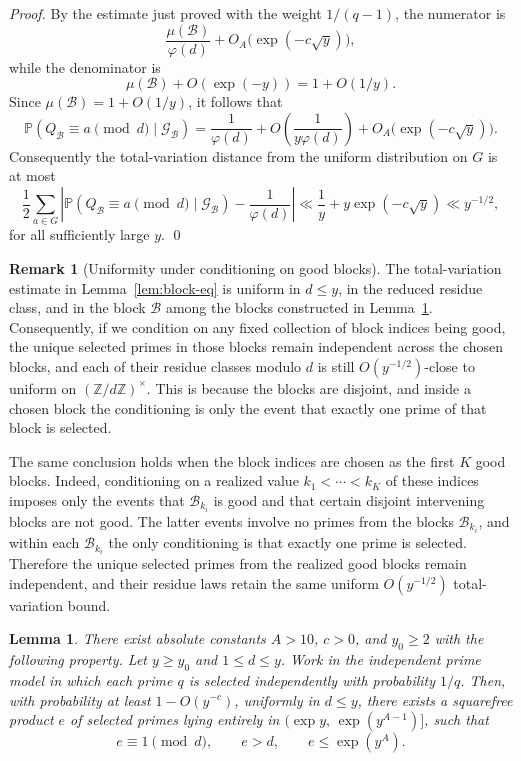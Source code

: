 \documentclass[11pt,reqno]{amsart}
\theoremstyle{plain}
\newtheorem{lemma}[theorem]{Lemma}
\theoremstyle{definition}
\newtheorem{remark}[theorem]{Remark}
\newcommand{\ZZ}{\mathbb{Z}}
\newcommand{\PP}{\mathbb{P}}
\begin{document}
\begin{proof}
By the estimate just proved with the weight $1/(q-1)$, the numerator is
\[
\frac{\mu(\mathcal B)}{\varphi(d)}
+
O_A\bigl(\exp(-c\sqrt y)\bigr),
\]
while the denominator is
\[
\mu(\mathcal B)+O(\exp(-y))=1+O(1/y).
\]
Since $\mu(\mathcal B)=1+O(1/y)$, it follows that
\[
\PP(Q_{\mathcal B}\equiv a\pmod d\mid \mathcal G_{\mathcal B})
=
\frac1{\varphi(d)}
+
O\!\left(\frac{1}{y\varphi(d)}\right)
+
O_A\bigl(\exp(-c\sqrt y)\bigr).
\]
Consequently the total-variation distance from the uniform distribution on
$G$ is at most
\[
\frac12\sum_{a\in G}
\left|
\PP(Q_{\mathcal B}\equiv a\pmod d\mid \mathcal G_{\mathcal B})
-\frac1{\varphi(d)}
\right|
\ll
\frac1y+y\exp(-c\sqrt y)
\ll y^{-1/2},
\]
for all sufficiently large $y$. \qed
\end{proof}

\begin{remark}[Uniformity under conditioning on good blocks]\label{rem:block-uniformity}
The total-variation estimate in Lemma~\ref{lem:block-eq} is uniform in
$d\le y$, in the reduced residue class, and in the block $\mathcal B$ among
the blocks constructed in Lemma~\ref{lem:composite-successor}. Consequently,
if we condition on any fixed collection of block indices being good, the unique
selected primes in those blocks remain independent across the chosen blocks,
and each of their residue classes modulo $d$ is still $O(y^{-1/2})$-close to
uniform on $(\ZZ/d\ZZ)^\times$. This is because the blocks are disjoint, and
inside a chosen block the conditioning is only the event that exactly one prime
of that block is selected.

The same conclusion holds when the block indices are chosen as the first
$K$ good blocks. Indeed, conditioning on a realized value
$k_1<\cdots<k_K$ of these indices imposes only the events that
$\mathcal B_{k_i}$ is good and that certain disjoint intervening blocks are
not good. The latter events involve no primes from the blocks
$\mathcal B_{k_i}$, and within each $\mathcal B_{k_i}$ the only conditioning
is that exactly one prime is selected. Therefore the unique selected primes
from the realized good blocks remain independent, and their residue laws retain
the same uniform $O(y^{-1/2})$ total-variation bound.
\end{remark}

\begin{lemma}\label{lem:composite-successor}
There exist absolute constants $A>10$, $c>0$, and $y_0\ge 2$ with the following
property. Let $y\ge y_0$ and $1\le d\le y$. Work in the independent prime model
in which each prime $q$ is selected independently with probability $1/q$. Then,
with probability at least $1-O(y^{-c})$, uniformly in $d\le y$, there exists a
squarefree product $e$ of \emph{selected} primes lying entirely in
$\bigl(\exp y,\,\exp(y^{A-1})\bigr]$, such that
\begin{equation}\label{eq:composite-successor}
e\equiv 1\pmod d, \qquad e>d, \qquad e\le \exp(y^A).
\end{equation}
\end{lemma}
\end{document}
